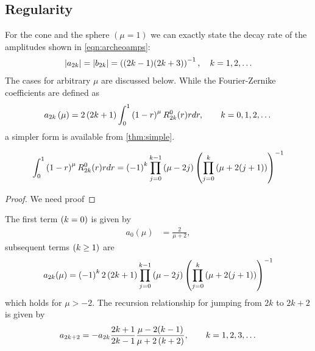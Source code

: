 \documentclass[preprint,12pt]{elsarticle}
\begin{document}
\subsection{Regularity}
For the cone and the sphere $(\mu=1)$ we can exactly state the decay rate of the amplitudes shown in \eqref{eqn:archeoamps}: 
  \begin{equation}
    \begin{split}
      \left|a_{2k}\right| = \left|b_{2k}\right| = \left(  (2k - 1 ) ( 2k + 3 )  \right)^{-1}, \quad k = 1, 2, \dots
    \end{split}
  \end{equation}
The cases for arbitrary $\mu$ are discussed below. While the Fourier-Zernike coefficients are defined as
\begin{equation}
    a_{2k}\left( \mu \right) = 2\left( 2k+1 \right) \int_{0}^{1} \left( 1 - r \right)^{\mu} R_{2k}^{0}(r) r dr, \qquad k=0,1,2,\dots
\end{equation}
a simpler form is available from \ref{thm:simple}.
{\color{blue}
\begin{myTheorem}  %
  \begin{equation}
    \int_{0}^{1} \left( 1 - r \right)^{\mu} R_{2k}^{0}(r) r dr = \left( -1 \right)^{k} \prod_{j=0}^{k-1}\left( \mu - 2j \right) \left( \prod_{j=0}^{k}\left( \mu + 2(j+1) \right) \right)^{-1}
  \end{equation}	
  \label{thm:simple}
\end{myTheorem}  %
\begin{proof}  %
  We need proof
\end{proof}  %
}
 The first term $\left( k=0 \right)$ is given by
\begin{equation}
  \begin{split}
      a_{0}(\mu) &=  \frac{2}{\mu + 2},
  \end{split}
\end{equation}
subsequent terms $\left( k\ge1 \right)$ are
\begin{equation}
    a_{2k}(\mu) = \left( -1 \right)^{k} 2\left( 2k+1 \right) \prod_{j=0}^{k-1}\left( \mu - 2j \right) \left( \prod_{j=0}^{k}\left( \mu + 2(j+1) \right) \right)^{-1}
\end{equation}
which holds for $\mu>-2$. The recursion relationship for jumping from $2k$ to $2k+2$ is given by
  \begin{equation}
      a_{2k+2} = - a_{2k} \frac{2k+1} {2k-1} \frac{\mu - 2(k-1)} {\mu + 2\left( k + 2 \right)}, \qquad k = 1,2,3, \dots
  \end{equation}
\end{document}
